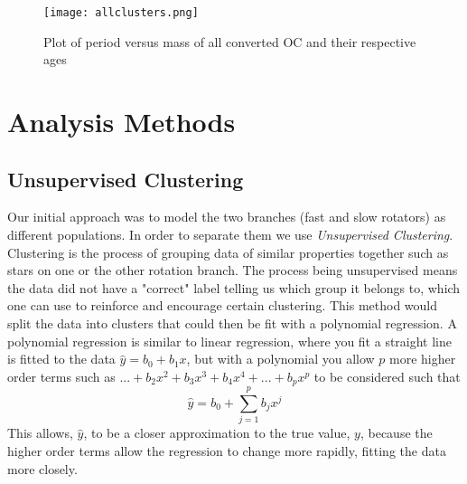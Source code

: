 \documentclass[fleqn,usenatbib]{mnras}
\begin{document}
\begin{figure}
	\centering
	\texttt{[image: allclusters.png]}
	\caption[]{Plot of period versus mass of all converted OC and their respective ages}
	\label{fig:allclusters}
\end{figure}


\section{Analysis Methods}
\subsection{Unsupervised Clustering}
Our initial approach was to model the two branches (fast and slow rotators) as different populations. In order to separate them we use \textit{Unsupervised Clustering}.
Clustering is the process of grouping data of similar properties together such as stars on one or the other rotation branch.
The process being unsupervised means the data did not have a "correct" label telling us which group it belongs to, which one can use to reinforce and encourage certain clustering.
This method would split the data into clusters that could then be fit with a polynomial regression.
A polynomial regression is similar to linear regression, where you fit a straight line is fitted to the data $\hat{y} = b_0 + b_1x$, but with a polynomial you allow $p$ more higher order terms such as $...+ b_2x^2 + b_3x^3+b_4x^4+...+b_px^p $ to be considered such that
\begin{equation}
	\label{eq:poly}
	\hat{y} = b_0 + \sum_{j = 1}^p b_jx^j
\end{equation}
This allows, $\hat{y}$, to be a closer approximation to the true value, $y$, because the higher order terms allow the regression to change more rapidly, fitting the data more closely.
\end{document}
